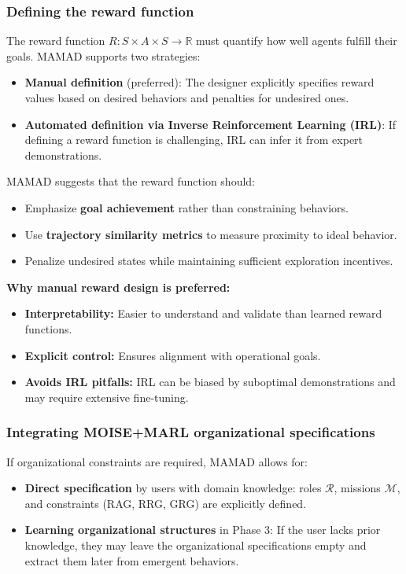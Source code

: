 \documentclass[pdflatex,sn-mathphys-num]{sn-jnl}%
\theoremstyle{thmstyleone}%
\theoremstyle{thmstyletwo}%
\theoremstyle{thmstylethree}%
\begin{document}
\subsubsection{Defining the reward function}
The reward function $R: S \times A \times S \to \mathbb{R}$ must quantify how well agents fulfill their goals. MAMAD supports two strategies:
\begin{itemize}
    \item \textbf{Manual definition} (preferred): The designer explicitly specifies reward values based on desired behaviors and penalties for undesired ones.
    \item \textbf{Automated definition via Inverse Reinforcement Learning (IRL)}: If defining a reward function is challenging, IRL can infer it from expert demonstrations.
\end{itemize}

MAMAD suggests that the reward function should:
\begin{itemize}
    \item Emphasize \textbf{goal achievement} rather than constraining behaviors.
    \item Use \textbf{trajectory similarity metrics} to measure proximity to ideal behavior.
    \item Penalize undesired states while maintaining sufficient exploration incentives.
\end{itemize}

\noindent \textbf{Why manual reward design is preferred:}
\begin{itemize}
    \item \textbf{Interpretability:} Easier to understand and validate than learned reward functions.
    \item \textbf{Explicit control:} Ensures alignment with operational goals.
    \item \textbf{Avoids IRL pitfalls:} IRL can be biased by suboptimal demonstrations and may require extensive fine-tuning.
\end{itemize}

\subsubsection{Integrating MOISE+MARL organizational specifications}
If organizational constraints are required, MAMAD allows for:
\begin{itemize}
    \item \textbf{Direct specification} by users with domain knowledge: roles $\mathcal{R}$, missions $\mathcal{M}$, and constraints (RAG, RRG, GRG) are explicitly defined.
    \item \textbf{Learning organizational structures} in Phase 3: If the user lacks prior knowledge, they may leave the organizational specifications empty and extract them later from emergent behaviors.
\end{itemize}
\end{document}
